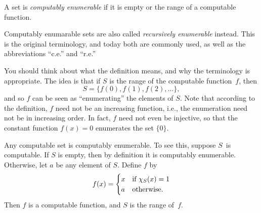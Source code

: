 \documentclass[../../include/open-logic-section]{subfiles}
\begin{document}

\begin{defn}
A set is \emph{computably enumerable} if it is empty or the range of a
computable function.
\end{defn}

\begin{history}
Computably enumarable sets are also called \emph{recursively
  enumerable} instead. This is the original terminology, and today
both are commonly used, as well as the abbreviations ``c.e.'' and
``r.e.'' 
\end{history}

\begin{explain}
You should think about what the definition means, and why the
terminology is appropriate. The idea is that if $S$ is the range of
the computable function~$f$, then
\[
S = \{ f(0), f(1), f(2), \dots \},
\]
and so $f$ can be seen as ``enumerating'' the elements of $S$. Note
that according to the definition, $f$ need not be an increasing
function, i.e., the enumeration need not be in increasing order. In
fact, $f$ need not even be injective, so that the constant function
$f(x) = 0$ enumerates the set $\{ 0 \}$.
\end{explain}

Any computable set is computably enumerable. To see this, suppose
$S$~is computable. If $S$ is empty, then by definition it is
computably enumerable. Otherwise, let $a$ be any element of
$S$. Define $f$ by
\[
f(x) = 
\begin{cases}
x & \text{if $\Char{S}(x) = 1$} \\
a & \text{otherwise.}
\end{cases}
\]
Then $f$ is a computable function, and $S$ is the range of~$f$.
\end{document}
